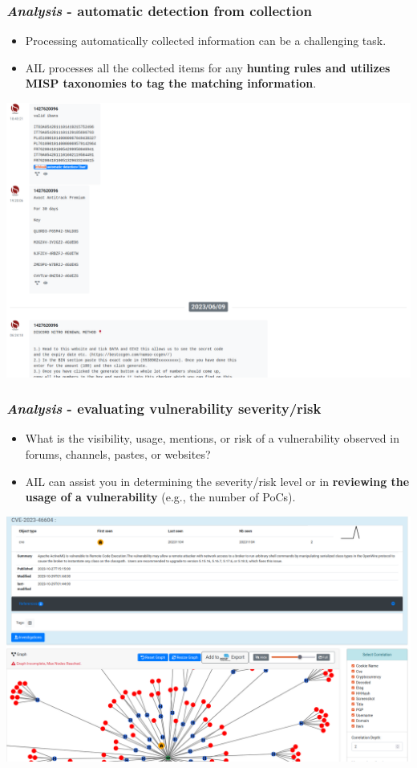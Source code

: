 \documentclass{beamer}
\begin{document}
\begin{frame}
   \frametitle{{\it Analysis} - automatic detection from collection}
   \begin{itemize}
     \item Processing automatically collected information can be a challenging task.
     \item AIL processes all the collected items for any {\bf hunting rules and utilizes MISP taxonomies to tag the matching information}.
   \end{itemize}
    \begin{center}
        \includegraphics[scale=0.2]{images/ail-chat-detection.png}
    \end{center}
\end{frame}

\begin{frame}
    \frametitle{{\it Analysis} - evaluating vulnerability severity/risk}
    \begin{itemize}
         \item What is the visibility, usage, mentions, or risk of a vulnerability observed in forums, channels, pastes, or websites?
         \item AIL can assist you in determining the severity/risk level or in {\bf reviewing the usage of a vulnerability} (e.g., the number of PoCs).
    \end{itemize}
    \begin{center}
         \includegraphics[scale=0.15]{images/ail-CVE-example.png}
    \end{center}
\end{frame}
\end{document}
